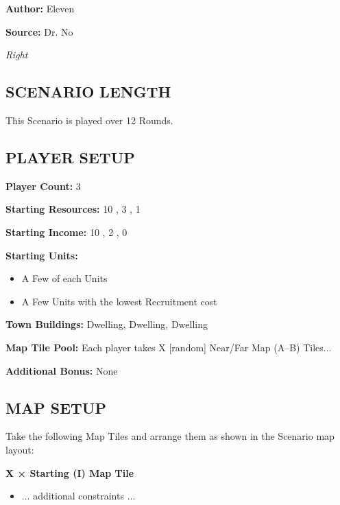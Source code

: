 
\begin{multicols*}{2}

\textbf{Author:} Eleven

\textbf{Source:} Dr. No

\textit{Right}

\subsection*{\MakeUppercase{Scenario Length}}

This Scenario is played over 12 Rounds.

\subsection*{\MakeUppercase{Player Setup}}

\textbf{Player Count:} 3

\textbf{Starting Resources:} 10 , 3 , 1 

\textbf{Starting Income:} 10 , 2 , 0 

\textbf{Starting Units:}
\begin{itemize}
  \item A Few of each  Units
  \item A Few  Units with the lowest Recruitment cost
\end{itemize}

\textbf{Town Buildings:}  Dwelling,  Dwelling,  Dwelling

\textbf{Map Tile Pool:} Each player takes X [random] Near/Far Map (A--B) Tiles...

\textbf{Additional Bonus:} None

\subsection*{\MakeUppercase{Map Setup}}

Take the following Map Tiles and arrange them as shown in the Scenario map layout:

\textbf{X × Starting (I) Map Tile}
\begin{itemize}
    \item ... additional constraints ...
\end{itemize}


\end{multicols*}
